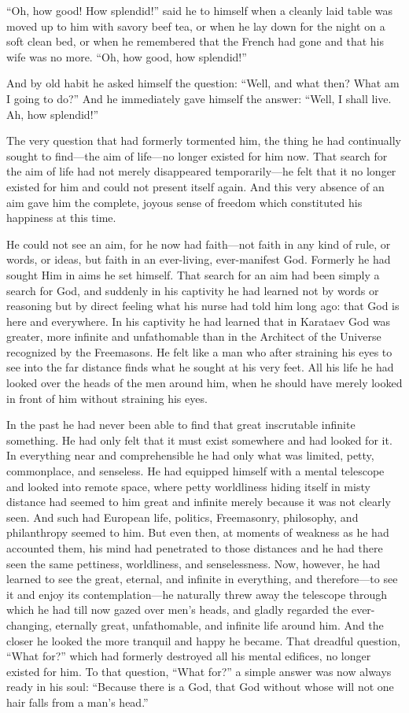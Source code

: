 ``Oh, how good! How splendid!'' said he to himself when a cleanly
laid table was moved up to him with savory beef tea, or when he
lay down for the night on a soft clean bed, or when he remembered
that the French had gone and that his wife was no more. ``Oh, how
good, how splendid!''

And by old habit he asked himself the question: ``Well, and what
then?  What am I going to do?'' And he immediately gave himself
the answer: ``Well, I shall live. Ah, how splendid!''

The very question that had formerly tormented him, the thing he
had continually sought to find---the aim of life---no longer
existed for him now. That search for the aim of life had not
merely disappeared temporarily---he felt that it no longer
existed for him and could not present itself again. And this very
absence of an aim gave him the complete, joyous sense of freedom
which constituted his happiness at this time.

He could not see an aim, for he now had faith---not faith in any
kind of rule, or words, or ideas, but faith in an ever-living,
ever-manifest God. Formerly he had sought Him in aims he set
himself. That search for an aim had been simply a search for God,
and suddenly in his captivity he had learned not by words or
reasoning but by direct feeling what his nurse had told him long
ago: that God is here and everywhere. In his captivity he had
learned that in Karataev God was greater, more infinite and
unfathomable than in the Architect of the Universe recognized by
the Freemasons. He felt like a man who after straining his eyes
to see into the far distance finds what he sought at his very
feet. All his life he had looked over the heads of the men around
him, when he should have merely looked in front of him without
straining his eyes.

In the past he had never been able to find that great inscrutable
infinite something. He had only felt that it must exist somewhere
and had looked for it. In everything near and comprehensible he
had only what was limited, petty, commonplace, and senseless. He
had equipped himself with a mental telescope and looked into
remote space, where petty worldliness hiding itself in misty
distance had seemed to him great and infinite merely because it
was not clearly seen. And such had European life, politics,
Freemasonry, philosophy, and philanthropy seemed to him. But even
then, at moments of weakness as he had accounted them, his mind
had penetrated to those distances and he had there seen the same
pettiness, worldliness, and senselessness. Now, however, he had
learned to see the great, eternal, and infinite in everything,
and therefore---to see it and enjoy its contemplation---he
naturally threw away the telescope through which he had till now
gazed over men's heads, and gladly regarded the ever-changing,
eternally great, unfathomable, and infinite life around him. And
the closer he looked the more tranquil and happy he became. That
dreadful question, ``What for?'' which had formerly destroyed all
his mental edifices, no longer existed for him.  To that
question, ``What for?'' a simple answer was now always ready in
his soul: ``Because there is a God, that God without whose will
not one hair falls from a man's head.''

